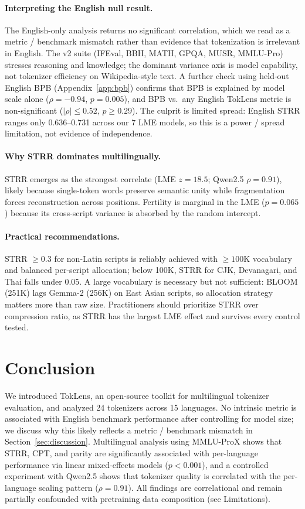 \documentclass[11pt]{article}
\begin{document}
\paragraph{Interpreting the English null result.} The English-only analysis returns no significant correlation, which we read as a metric / benchmark mismatch rather than evidence that tokenization is irrelevant in English. The v2 suite (IFEval, BBH, MATH, GPQA, MUSR, MMLU-Pro) stresses reasoning and knowledge; the dominant variance axis is model capability, not tokenizer efficiency on Wikipedia-style text. A further check using held-out English BPB (Appendix~\ref{app:bpb}) confirms that BPB is explained by model scale alone ($\rho = -0.94$, $p = 0.005$), and BPB vs.\ any English TokLens metric is non-significant ($|\rho| \leq 0.52$, $p \geq 0.29$). The culprit is limited spread: English STRR ranges only 0.636--0.731 across our 7 LME models, so this is a power / spread limitation, not evidence of independence.

\paragraph{Why STRR dominates multilingually.} STRR emerges as the strongest correlate (LME $z = 18.5$; Qwen2.5 $\rho = 0.91$), likely because single-token words preserve semantic unity while fragmentation forces reconstruction across positions. Fertility is marginal in the LME ($p = 0.065$) because its cross-script variance is absorbed by the random intercept.

\paragraph{Practical recommendations.} STRR $\geq 0.3$ for non-Latin scripts is reliably achieved with $\geq 100$K vocabulary and balanced per-script allocation; below 100K, STRR for CJK, Devanagari, and Thai falls under 0.05. A large vocabulary is necessary but not sufficient: BLOOM (251K) lags Gemma-2 (256K) on East Asian scripts, so allocation strategy matters more than raw size. Practitioners should prioritize STRR over compression ratio, as STRR has the largest LME effect and survives every control tested.

\section{Conclusion}

We introduced TokLens, an open-source toolkit for multilingual tokenizer evaluation, and analyzed 24 tokenizers across 15 languages. No intrinsic metric is associated with English benchmark performance after controlling for model size; we discuss why this likely reflects a metric / benchmark mismatch in Section~\ref{sec:discussion}. Multilingual analysis using MMLU-ProX shows that STRR, CPT, and parity are significantly associated with per-language performance via linear mixed-effects models ($p < 0.001$), and a controlled experiment with Qwen2.5 shows that tokenizer quality is correlated with the per-language scaling pattern ($\rho = 0.91$). All findings are correlational and remain partially confounded with pretraining data composition (see Limitations).
\end{document}
